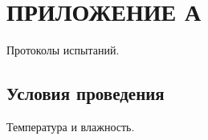 \newpage
\section*{ПРИЛОЖЕНИЕ А}

Протоколы испытаний.

\subsection{Условия проведения} %

Температура и влажность.
